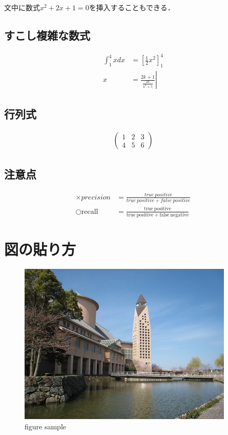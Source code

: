 \documentclass[uplatex,11pt,a4j]{jsarticle}
\begin{document}
文中に数式$x^2 + 2x + 1 = 0$を挿入することもできる．

\subsection{すこし複雑な数式}
\begin{align}
  \int_{1}^{4}x dx &= \left[ \frac{1}{2}x^2 \right]_1^4 \\
  x &= \left. \frac{2k + 1}{ \frac{2k}{k^2+5}} \right|
\end{align}

\subsection{行列式}
\begin{align}
\left(
\begin{array}{ccc}
  1 & 2 & 3 \\
  4 & 5 & 6
\end{array}
\right)
\end{align}

\subsection{注意点}
\begin{align}
\times precision &=
\displaystyle \frac{true\ positive}{true\ positive + false\ positive} \nonumber\\
\bigcirc \mathrm{recall} &=
\displaystyle \frac{ \mathrm{true\ positive}}{\mathrm{true\ positive} + \mathrm{false\ negative}} \nonumber
\end{align}

\section{図の貼り方}
\begin{figure}[htbp]
  \centering
  \includegraphics[width=0.5\hsize]{./figures/kendai_a22.jpg}
  \caption{figure sample}
  \label{fig:sample}
\end{figure}
\end{document}
